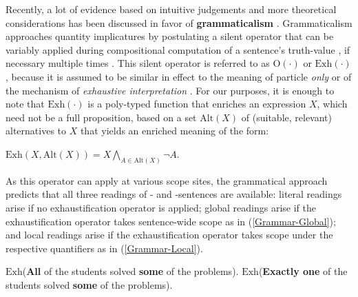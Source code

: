 \documentclass[fleqn,reqno,10pt,draft]{article}
\newcommand{\as}{\acro{as}}
\renewcommand{\es}{\acro{es}}
\newcommand{\exh}{\ensuremath{\mathrm{Exh}}}
\newcommand{\alt}{\ensuremath{\mathrm{Alt}}}
\renewcommand{\mymark}[1]{\textbf{#1}}
\begin{document}
Recently, a lot of evidence based on intuitive judgements and more
theoretical considerations has been discussed in favor of
\mymark{grammaticalism}
\citep[see][]{Chierchia2006:Broaden-Your-Vi,Fox2007:Free-Choice-and,Magri2011:Another-Argumen,Sauerland2012:The-Computation,ChierchiaFox2008:The-Grammatical}. %
Grammaticalism approaches quantity implicatures by postulating a
silent operator that can be variably applied during compositional
computation of a sentence's truth-value
\citep{Chierchia2006:Broaden-Your-Vi}, if necessary multiple times
\citep{Fox2007:Free-Choice-and}. This silent operator is referred to
as $\mathrm{O}(\cdot)$ or $\exh(\cdot)$, because it is assumed to be
similar in effect to the meaning of particle \emph{only} or of the
mechanism of \emph{exhaustive interpretation}
\citep{GroenendijkStokhofThesis1984,Stechowvon-StechowZimmermann1984:Term-Answers-an,Rooijvan-RooijSchulz2013:Exhaustive-Inte,vanRooijSchulz:ExhaustiveInterpretation,Fox2007:Free-Choice-and}. For
our purposes, it is enough to note that $\exh(\cdot)$ is a poly-typed
function that enriches an expression $X$, which need not be a full
proposition, based on a set $\alt(X)$ of (suitable, relevant)
alternatives to $X$ that yields an enriched meaning of the
form:
\begin{exe}
  \ex \label{bsp:Exh-Def} $\exh(X,\alt(X)) = X \bigwedge_{A \in
      \alt(X)} \neg A$.
\end{exe}

As this operator can apply at various scope sites, the grammatical
approach predicts that all three readings of \as- and \es-sentences
are available: literal readings arise if no exhaustification operator
is applied; global readings arise if the exhaustification operator
takes sentence-wide scope as in (\ref{Grammar-Global}); and local
readings arise if the exhaustification operator takes scope under the
respective quantifiers as in (\ref{Grammar-Local}).

\begin{exe}
  \ex \label{Grammar-Global}
    \begin{xlist}
      \ex \label{Grammar-Global-AE} \mymark{$\exh$}(\mymark{All} of the students solved
        \mymark{some} of the problems).
      \ex \label{Grammar-Global-GE} \mymark{$\exh$}(\mymark{Exactly one} of the students solved
        \mymark{some} of the problems).
    \end{xlist}
\end{exe}
\end{document}

